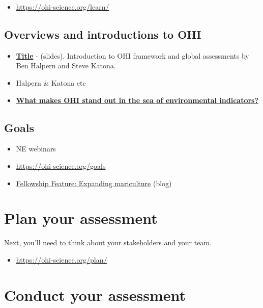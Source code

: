 \documentclass[
]{book}
\providecommand{\tightlist}{%
  \setlength{\itemsep}{0pt}\setlength{\parskip}{0pt}}
\begin{document}
\begin{itemize}
\tightlist
\item
  \url{https://ohi-science.org/learn/}
\end{itemize}

\hypertarget{overviews-and-introductions-to-ohi}{%
\section{Overviews and introductions to OHI}\label{overviews-and-introductions-to-ohi}}

\begin{itemize}
\tightlist
\item
  \href{link}{\textbf{Title}} - (slides). Introduction to OHI framework and global assessments by Ben Halpern and Steve Katona.
\item
  Halpern \& Katona etc
\item
  \href{https://ohi-science.org/news/goal-forward-approach}{\textbf{What makes OHI stand out in the sea of environmental indicators?}}
\end{itemize}

\hypertarget{goals}{%
\section{Goals}\label{goals}}

\begin{itemize}
\item
  NE webinars
\item
  \url{https://ohi-science.org/goals}
\item
  \href{https://ohi-science.org/news/fellowship-expanding-mariculture}{Fellowship Feature: Expanding mariculture} (blog)
\end{itemize}

\hypertarget{plan}{%
\chapter{Plan your assessment}\label{plan}}

Next, you'll need to think about your stakeholders and your team.

\begin{itemize}
\tightlist
\item
  \url{https://ohi-science.org/plan/}
\end{itemize}

\hypertarget{conduct}{%
\chapter{Conduct your assessment}\label{conduct}}
\end{document}

